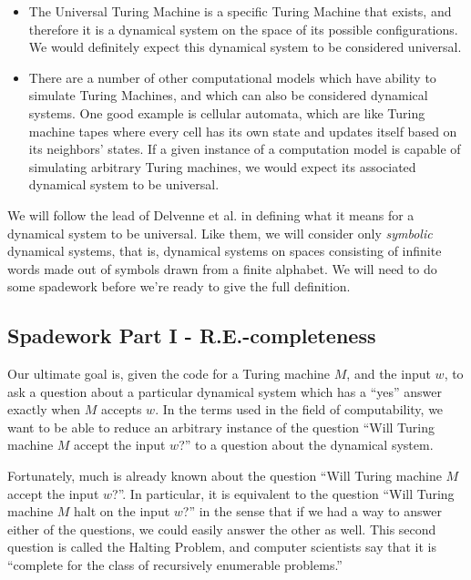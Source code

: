 \documentclass{fkpaper}
\begin{document}
\begin{multicols}{2}
\begin{itemize}
  \item The Universal Turing Machine is a specific Turing Machine that exists, and therefore it is a dynamical system on the space of its possible configurations. We would definitely expect this dynamical system to be considered universal.

  \item There are a number of other computational models which have ability to simulate Turing Machines, and which can also be considered dynamical systems. One good example is cellular automata, which are like Turing machine tapes where every cell has its own state and updates itself based on its neighbors' states. If a given instance of a computation model is capable of simulating arbitrary Turing machines, we would expect its associated dynamical system to be universal.

\end{itemize}

We will follow the lead of Delvenne et al. \cite{Delvenne2004Apr} in defining what
it means for a dynamical system to be universal. Like them, we will
consider only {\it symbolic} dynamical systems, that is, dynamical
systems on spaces consisting of infinite words made out of symbols
drawn from a finite alphabet. We will need to do some spadework before
we're ready to give the full definition.

\subsection{Spadework Part I - R.E.-completeness}

Our ultimate goal is, given the code for a Turing machine $M$, and the
input $w$, to ask a question about a particular dynamical system which
has a ``yes'' answer exactly when $M$ accepts $w$. In the terms used
in the field of computability, we want to be able to reduce an
arbitrary instance of the question ``Will Turing machine $M$ accept
the input $w$?'' to a question about the dynamical system.

Fortunately, much is already known about the question ``Will Turing
machine $M$ accept the input $w$?''. In particular, it is equivalent
to the question ``Will Turing machine $M$ halt on the input $w$?'' in
the sense that if we had a way to answer either of the questions, we
could easily answer the other as well. This second question is called
the Halting Problem, and computer scientists say that it is ``complete
for the class of recursively enumerable problems.''


\end{multicols}
\end{document}
